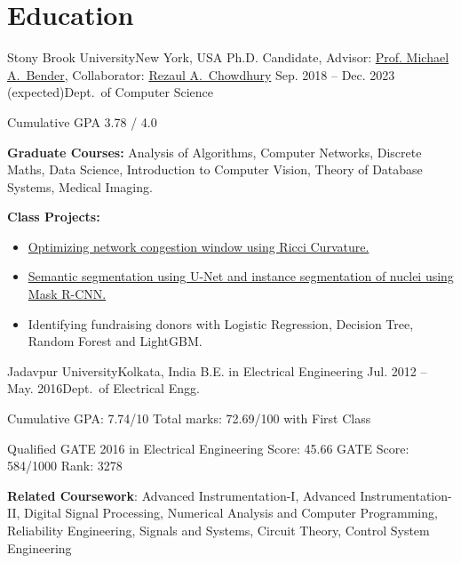 \documentclass[letterpaper,10pt]{article}
\begin{document}
\section*{Education}
\resumeSubHeadingListStart
\resumeSubheading
{Stony Brook University}{New York, USA}
{Ph.D. Candidate, Advisor: \href{https://www3.cs.stonybrook.edu/~bender/}{Prof. Michael A.\ Bender}, Collaborator: \href{https://www3.cs.stonybrook.edu/~rezaul/}{Rezaul A.\ Chowdhury}}
{Sep. 2018 -- Dec. 2023 (expected)}{Dept.\ of Computer Science}
\resumeItemListStart
\item Cumulative GPA 3.78 / 4.0
\item \textbf{Graduate Courses:} Analysis of Algorithms, Computer Networks, Discrete Maths, Data Science, Introduction to Computer Vision, Theory of Database Systems, Medical Imaging.
\item \textbf{Class Projects:} 
\begin{itemize}
    \item \href{https://github.com/ArghyaB118/network_curvature/blob/master/Text/project_534.pdf}{Optimizing network congestion window using Ricci Curvature.}
    \item \href{https://github.com/ArghyaB118/Image_Segmentation/blob/main/Project_CSE527/Final_Report.pdf}{Semantic segmentation using U-Net and instance segmentation of nuclei using Mask R-CNN.}
    \item {Identifying fundraising donors with Logistic Regression, Decision Tree, Random Forest and LightGBM.}
\end{itemize}
\resumeItemListEnd

\resumeSubheading
{Jadavpur University}{Kolkata, India}
{B.E. in Electrical Engineering }{Jul. 2012 -- May. 2016}{Dept.\ of Electrical Engg.}
\resumeItemListStart
\item {Cumulative GPA: 7.74/10 Total marks: 72.69/100 with First Class}
\item {Qualified GATE 2016 in Electrical Engineering Score: 45.66 GATE Score: 584/1000 Rank: 3278}
\item {\textbf{Related Coursework}: Advanced Instrumentation-I, Advanced Instrumentation-II, Digital Signal Processing, Numerical Analysis and Computer Programming, Reliability Engineering, Signals and Systems, Circuit Theory, Control System Engineering}
\resumeItemListEnd
\iffalse
\resumeSubheading
{Howrah Zilla School}{Howrah, India}
{Secondary Education and Higher-Secondary Education}{2002 - 2012}
\resumeItemListStart
    \item {$367^{th}$ in the West Bengal Joint Entrance Examination, 2012.}
    \item {State Rank of $372^{th}$ \comm{(General - 352nd)}in the AIEEE, 2012.}
    \item {82\% in Higher Secondary Examination with Science Major (+2 level), with 90.5\% in the Mathematics and Physics, 2012 West Bengal Council of Higher Secondary Education.}
    \item {85\% in Madhyamik Examination (10 level), 2010, with 95.33\% in the Science group (Mathematics, Science and Life Science) West Bengal Board of Secondary Education.}
\resumeItemListEnd
\fi
\resumeSubHeadingListEnd 
\end{document}

